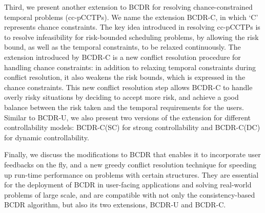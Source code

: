 \documentclass[jair,twoside,11pt,theapa]{article}
\begin{document}
Third, we present another extension to BCDR for resolving chance-constrained
temporal problems (cc-pCCTPs). We name the extension BCDR-C, in which `C'
represents chance constraints. The key idea introduced in resolving cc-pCCTPs is
to resolve infeasibility for risk-bounded scheduling problems, by allowing the
risk bound, as well as the temporal constraints, to be relaxed continuously. The
extension introduced by BCDR-C is a new conflict resolution procedure for
handling chance constraints: in addition to relaxing temporal constraints during
conflict resolution, it also weakens the risk bounds, which is expressed in the
chance constraints. This new conflict resolution step allows BCDR-C to handle
overly risky situations by deciding to accept more risk, and achieve a good
balance between the risk taken and the temporal requirements for the users. Similar to BCDR-U, we also present two versions of the extension for different controllability models: BCDR-C(SC) for strong controllability and BCDR-C(DC) for dynamic controllability.


%


%
%


%
%
%
%
%


Finally, we discuss the modifications to BCDR that enables it to incorporate
user feedbacks on the fly, and a new greedy conflict resolution technique for
speeding up run-time performance on problems with certain structures. They are
essential for the deployment of BCDR in user-facing applications and solving
real-world problems of large scale, and are compatible with not only the consistency-based BCDR algorithm, but also its two extensions, BCDR-U and BCDR-C.
\end{document}
